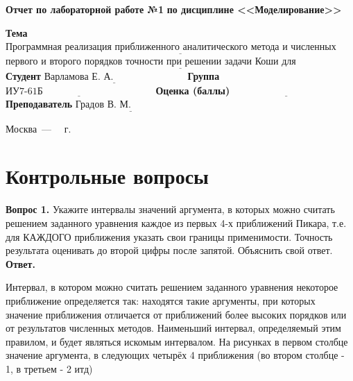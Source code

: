 \documentclass[12pt]{report}
\begin{document}
\begin{titlepage}
		\begin{center}
			\noindent\begin{minipage}{1.1\textwidth}\centering
				\Large\textbf{  Отчет по лабораторной работе №1}\newline
				\textbf{по дисциплине <<Моделирование>>}\newline
			\end{minipage}
		\end{center}
		
		\noindent\textbf{Тема} $\underline{\text{Программная реализация приближенного аналитического метода и численных алгоритмов}}$
		$\underline{\text{первого и второго порядков точности при решении задачи Коши для ОДУ.~~~~~~~~~~~~~~~~~~~~~~~~~~~~~~}}$\newline\newline
		\noindent\textbf{Студент} $\underline{\text{Варламова Е. А.~~~~~~~~~~~~~~~~~~~~~~}}$\newline\newline
		\noindent\textbf{Группа} $\underline{\text{ИУ7-61Б~~~~~~~~~~~~~~~~~~~~~~~~~~~~~~~~~~}}$\newline\newline
		\noindent\textbf{Оценка (баллы)} $\underline{\text{~~~~~~~~~~~~~~~~~~~~~~~~~~~~~~~~~}}$\newline\newline
		\noindent\textbf{Преподаватель} $\underline{\text{Градов В. М.~~~~~~~~~~~~~~~~~}}$\newline\newline\newline
		
		\begin{center}
			\vfill
			Москва~---~\the\year
			~г.
		\end{center}
	\end{titlepage}
	
\setcounter{page}{2}
\section*{Контрольные вопросы}

\textbf{Вопрос 1.} Укажите интервалы значений аргумента, в которых можно считать решением заданного уравнения каждое из первых 4-х приближений Пикара, т.е. для КАЖДОГО приближения указать свои границы применимости. Точность результата оценивать до второй цифры после запятой. Объяснить свой ответ. \newline
\indent\textbf{Ответ. }

Интервал, в котором можно считать решением заданного уравнения некоторое приближение определяется так: находятся такие аргументы, при которых значение приближения отличается от приближений более высоких порядков или от результатов численных методов. Наименьший интервал, определяемый этим правилом, и будет являться искомым интервалом. На рисунках в первом столбце значение аргумента, в следующих четырёх 4 приближения (во втором столбце - 1, в третьем - 2 итд) 
\end{document}
